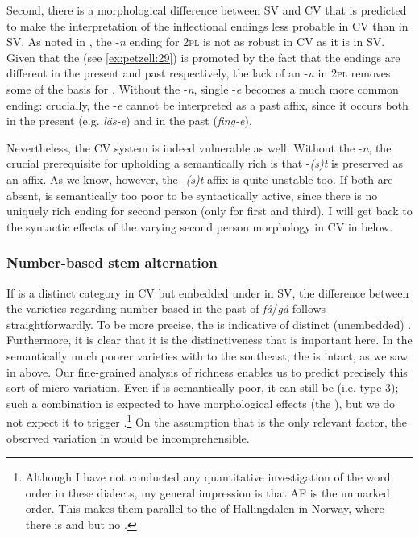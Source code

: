 \documentclass[output=paper,colorlinks,citecolor=brown,draft,draftmode]{langscibook}
\begin{document}
Second, there is a morphological difference between SV and CV that is predicted to make the  interpretation of the inflectional endings less probable in CV than in SV. As noted in , the -\textit{n} ending for 2\textsc{pl} is not as robust in CV as it is in SV. Given that the   (see \ref{ex:petzell:29}) is promoted by the fact that the endings are different in the present and past  respectively, the lack of an -\textit{n} in 2\textsc{pl} removes some of the basis for . Without the -\textit{n}, single -\textit{e} becomes a much more common ending: crucially, the -\textit{e} cannot be interpreted as a past  affix, since it occurs both in the present (e.g. \textit{läs-e}) and in the past  (\textit{fing-e}).



Nevertheless, the CV system is indeed vulnerable as well. Without the -\textit{n}, the crucial prerequisite for upholding a semantically rich  is that -\textit{(s)t} is preserved as an affix. As we know, however, the \textit{-(s)t} affix is quite unstable too. If both are absent,  is semantically too poor to be syntactically active, since there is no uniquely rich ending for second person (only for first and third). I will get back to the syntactic effects of the varying second person morphology in CV in  below.


\subsubsection{Number-based stem alternation}\label{sec:petzell:4.3.4}


If  is a distinct category in CV but embedded under  in SV, the difference between the varieties regarding number-based  in the past  of \textit{få}/\textit{gå} follows straightforwardly. To be more precise, the  is indicative of distinct (unembedded) . Furthermore, it is clear that it is the distinctiveness that is important here. In the semantically much poorer varieties with   to the southeast, the  is intact, as we saw in  above. Our fine-grained analysis of richness enables us to predict precisely this sort of micro-variation. Even if  is semantically poor, it can still be  (i.e. type 3); such a combination is expected to have morphological effects (the ), but we do not expect it to trigger .\footnote{Although I have not conducted any quantitative investigation of the  word order in these dialects, my general impression is that AF is the unmarked order. This makes them parallel to the  of Hallingdalen in Norway, where there is  and  but no  \citep{Trosterud1989}.}  On the assumption that  is the only relevant factor, the observed variation in  would be incomprehensible.
\end{document}
